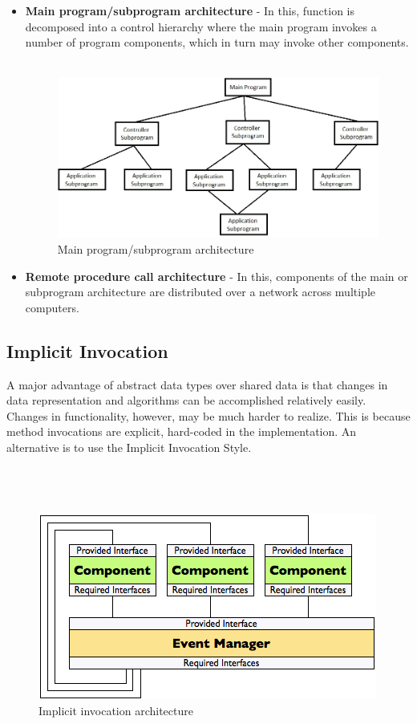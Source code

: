\documentclass{article}
\begin{document}
\begin{itemize}

\item \textbf{Main program/subprogram architecture} - In this, function is decomposed into a control hierarchy where the main program invokes a number of program components, which in turn may invoke other components.\\\\

\begin{figure}[h]
\centering
\includegraphics[scale=0.5]{c&r.jpg}
\caption{Main program/subprogram architecture}
\label{fig_c&r}
\end{figure}


\item \textbf{Remote procedure call architecture} - In this, components of the main or subprogram architecture are distributed over a network across multiple computers.

\end{itemize}
\newpage


\subsection{Implicit Invocation}
A major advantage of abstract data types over shared data is that changes in data representation and algorithms can be accomplished relatively easily. Changes in functionality, however, may be much harder to realize. This is because method invocations are explicit, hard-coded in the implementation. An alternative is to use the Implicit Invocation Style.\\\\\\\


\begin{figure}[h]
\centering
\includegraphics[scale=1]{ii.png}
\caption{Implicit invocation architecture}
\label{fig_ii}
\end{figure}
\end{document}
